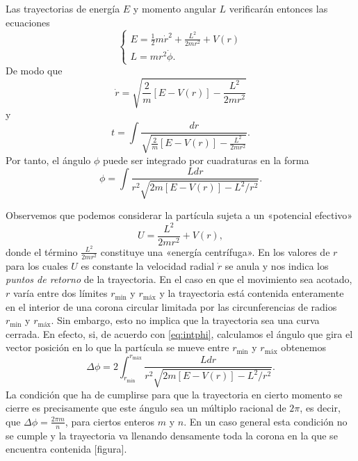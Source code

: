 \documentclass[12pt,a4paper,twoside]{article}
\theoremstyle{definition} \newtheorem{defn}[thm]{Definición}
\theoremstyle{definition} \newtheorem{ejemplo}[thm]{Ejemplo}
\theoremstyle{definition} \newtheorem{ejercicio}[thm]{Ejercicio}
\theoremstyle{remark} \newtheorem*{obs}{Observación}
\begin{document}
  Las trayectorias de energía $E$ y momento angular $L$ verificarán entonces las ecuaciones
  \begin{equation}
    \begin{cases}
    E=\tfrac{1}{2}m\dot r^2+\frac{L^2}{2mr^2}+V(r) \\
    L=mr^2\dot \phi.
  \end{cases}
  \end{equation}
  De modo que
  \begin{equation}
      \dot r=\sqrt{\frac{2}{m}[E-V(r)]-\frac{L^2}{2mr^2}} 
  \end{equation}
  y 
  \begin{equation}
    t=\int \frac{dr}{\sqrt{\frac{2}{m}[E-V(r)]-\frac{L^2}{2mr^2}}}.
  \end{equation}
  Por tanto, el ángulo $\phi$ puede ser integrado por cuadraturas en la forma
  \begin{equation}
    \phi=\int\frac{Ldr}{r^2\sqrt{2m[E-V(r)]-L^2/r^2}}. 
    \label{eq:intphi}
  \end{equation}

Observemos que podemos considerar la partícula sujeta a un «potencial efectivo»
\begin{equation}
  U=\frac{L^2}{2mr^2}+V(r),
\end{equation}
donde el término $\frac{L^2}{2mr^2}$ constituye una «energía centrífuga». En los valores de $r$ para los cuales $U$ es constante la velocidad radial $\dot r$ se anula y nos indica los \emph{puntos de retorno} de la trayectoria. En el caso en que el movimiento sea acotado, $r$ varía entre dos límites $r_{\text{min}}$ y $r_{\text{máx}}$ y la trayectoria está contenida enteramente en el interior de una corona circular limitada por las circunferencias de radios $r_{\text{min}}$ y $r_{\text{máx}}$. Sin embargo, esto no implica que la trayectoria sea una curva cerrada. En efecto, si, de acuerdo con \eqref{eq:intphi}, calculamos el ángulo que gira el vector posición en lo que la partícula se mueve entre $r_{\text{min}}$ y $r_{\text{máx}}$ obtenemos
\begin{equation}
  \Delta \phi = 2\int_{r_{\text{min}}}^{r_{\text{máx}}} \frac{Ldr}{r^2\sqrt{2m[E-V(r)]-L^2/r^2}}.
\end{equation}
La condición que ha de cumplirse para que la trayectoria en cierto momento se cierre es precisamente que este ángulo sea un múltiplo racional de $2\pi$, es decir, que $\Delta \phi = \frac{2\pi m}{n}$, para ciertos enteros $m$ y $n$. En un caso general esta condición no se cumple y la trayectoria va llenando densamente toda la corona en la que se encuentra contenida [figura].
\end{document}
